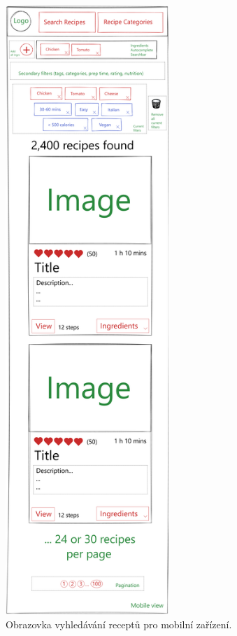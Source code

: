 \begin{figure}[p]\centering
\includegraphics[height=230mm]{../img/mobile-search-view}
\caption{Obrazovka vyhledávání receptů pro mobilní zařízení.}
\label{obr02:mobile-search-view}
\end{figure}


